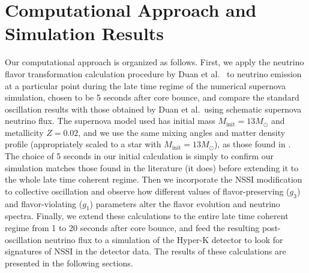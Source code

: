 \documentclass[a4paper,12pt]{article}
\begin{document}
\section{Computational Approach and Simulation Results}
Our computational approach is organized as follows. First, we apply the neutrino flavor transformation calculation procedure by Duan et al.\ \cite{Duan:2008eb} to neutrino emission at a particular point during the late time regime of the numerical supernova simulation, chosen to be 5 seconds after core bounce, and compare the standard oscillation results with those obtained by Duan et al.\ using schematic supernova neutrino flux. The supernova model used has initial mass $M_{\text{init}} = 13 M_{\odot}$ and metallicity $Z = 0.02$, and we use the same mixing angles and matter density profile (appropriately scaled to a star with $M_{\text{init}} = 13 M_{\odot}$), as those found in \cite{Duan:2008eb}. The choice of 5 seconds in our initial calculation is simply to confirm our simulation matches those found in the literature (it does) before extending it to the whole late time coherent regime. Then we incorporate the NSSI modification to collective oscillation and observe how different values of flavor-preserving ($g_{3}$) and flavor-violating ($g_{1}$) parameters alter the flavor evolution and neutrino spectra. Finally, we extend these calculations to the entire late time coherent regime from 1 to 20 seconds after core bounce, and feed the resulting post-oscillation neutrino flux to a simulation of the Hyper-K detector \cite{sntools} to look for signatures of NSSI in the detector data. The results of these calculations are presented in the following sections.
\end{document}

